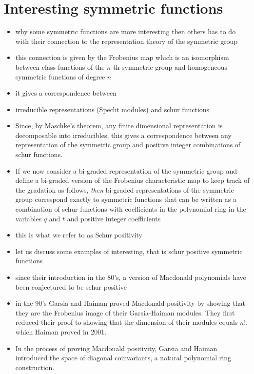 \documentclass{article}
\begin{document}
    \section{Interesting symmetric functions}
    \begin{itemize}
        \item why some symmetric functions are more interesting then others has to do with their connection to the representation theory of the symmetric group
        \item this connection is given by the Frobenius map which is an isomorphism between class functions of the $n$-th symmetric group and homogeneous symmetric functions of degree $n$
        \item it gives a correspondence between 
        \item irreducible representations (Specht modules) and schur functions
        \item Since, by Maschke's theorem, any finite dimensional representation is decomposable into irreducibles, this gives a correspondence between any representation of the symmetric group and positive integer combinations of schur functions. 
        \item If we now consider a bi-graded representation of the symmetric group and define a bi-graded version of the Frobenius characteristic map to keep track of the gradation as follows, \emph{then} bi-graded representations of the symmetric group correspond exactly to symmetric functions that can be written as a combination of schur functions with coefficients in the polynomial ring in the variables $q$ and $t$ and positive integer coefficients
        \item this is what we refer to as Schur positivity
        \item let us discuss some examples of interesting, that is schur positive symmetric functions
        \item since their introduction in the 80's, a version of Macdonald polynomials have been conjectured to be schur positive
        \item in the 90's Garsia and Haiman proved Macdonald positivity by showing that they are the Frobenius image of their Garsia-Haiman modules. They first reduced their proof to showing that the dimension of their modules equals $n!$, which Haiman proved in 2001. 
        \item In the process of proving Macdonald positivity, Garsia and Haiman introduced the space of diagonal coinvariants, a natural polynomial ring construction. 

\end{itemize}
\end{document}

